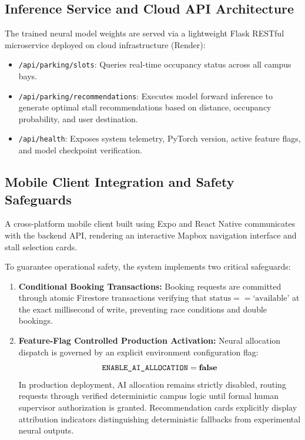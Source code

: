 \documentclass[journal]{IEEEtran}
\begin{document}
\subsection{Inference Service and Cloud API Architecture}
The trained neural model weights are served via a lightweight Flask RESTful microservice deployed on cloud infrastructure (Render):
\begin{itemize}
    \item \texttt{/api/parking/slots}: Queries real-time occupancy status across all campus bays.
    \item \texttt{/api/parking/recommendations}: Executes model forward inference to generate optimal stall recommendations based on distance, occupancy probability, and user destination.
    \item \texttt{/api/health}: Exposes system telemetry, PyTorch version, active feature flags, and model checkpoint verification.
\end{itemize}

\subsection{Mobile Client Integration and Safety Safeguards}
A cross-platform mobile client built using Expo and React Native communicates with the backend API, rendering an interactive Mapbox navigation interface and stall selection cards.

To guarantee operational safety, the system implements two critical safeguards:
\begin{enumerate}
    \item \textbf{Conditional Booking Transactions:} Booking requests are committed through atomic Firestore transactions verifying that $\text{status} == \text{`available'}$ at the exact millisecond of write, preventing race conditions and double bookings.
    \item \textbf{Feature-Flag Controlled Production Activation:} Neural allocation dispatch is governed by an explicit environment configuration flag:
    \begin{equation}
    \texttt{ENABLE\_AI\_ALLOCATION} = \text{\textbf{false}}
    \end{equation}
    In production deployment, AI allocation remains strictly disabled, routing requests through verified deterministic campus logic until formal human supervisor authorization is granted. Recommendation cards explicitly display attribution indicators distinguishing deterministic fallbacks from experimental neural outputs.
\end{enumerate}
\end{document}
